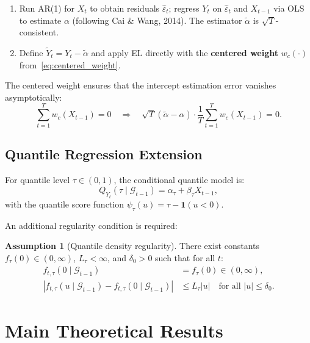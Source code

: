 \documentclass[11pt,a4paper]{article}
\theoremstyle{definition}
\newtheorem{assumption}{Assumption}[section]
\theoremstyle{remark}
\begin{document}
\begin{enumerate}[leftmargin=*, label=\textbf{Stage \arabic*:}]
    \item Run AR(1) for $X_t$ to obtain residuals $\widehat{\varepsilon}_t$;
    regress $Y_t$ on $\widehat{\varepsilon}_t$ and $X_{t-1}$ via OLS
    to estimate $\alpha$ (following Cai \& Wang, 2014).
    The estimator $\widetilde{\alpha}$ is $\sqrt{T}$-consistent.
    \item Define $\widetilde{Y}_t = Y_t - \widetilde{\alpha}$ and apply EL directly
    with the \textbf{centered weight} $w_c(\cdot)$ from~\eqref{eq:centered_weight}.
\end{enumerate}

The centered weight ensures that the intercept estimation error vanishes asymptotically:
\begin{equation}
    \sum_{t=1}^T w_c(X_{t-1}) = 0 \quad \Longrightarrow \quad
    \sqrt{T}(\widetilde{\alpha} - \alpha) \cdot \frac{1}{T}\sum_{t=1}^T w_c(X_{t-1}) = 0.
\end{equation}

\subsection{Quantile Regression Extension}

For quantile level $\tau \in (0,1)$, the conditional quantile model is:
\begin{equation}\label{eq:quantile_model}
    Q_{Y_t}(\tau \mid \mathcal{G}_{t-1}) = \alpha_\tau + \beta_\tau X_{t-1},
\end{equation}
with the quantile score function $\psi_\tau(u) = \tau - \mathbf{1}(u < 0)$.

An additional regularity condition is required:

\begin{assumption}[Quantile density regularity]\label{asm:quantile}
There exist constants $f_\tau(0) \in (0,\infty)$, $L_\tau < \infty$, and $\delta_0 > 0$
such that for all $t$:
\begin{align}
    f_{t,\tau}(0 \mid \mathcal{G}_{t-1}) &= f_\tau(0) \in (0,\infty), \\
    |f_{t,\tau}(u \mid \mathcal{G}_{t-1}) - f_{t,\tau}(0 \mid \mathcal{G}_{t-1})|
    &\leq L_\tau |u| \quad \text{for all } |u| \leq \delta_0.
\end{align}
\end{assumption}

\section{Main Theoretical Results}
\end{document}
